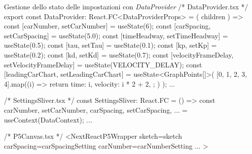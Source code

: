 \begin{tsCode}{Gestione dello stato delle impostazioni con \textit{DataProvider}}
/* DataProvider.tsx */
export const DataProvider: React.FC<DataProviderProps> = ({ children }) => {
  const [carNumber, setCarNumber] = useState(6);
  const [carSpacing, setCarSpacing] = useState(5.0);
  const [timeHeadway, setTimeHeadway] = useState(0.5);
  const [tau, setTau] = useState(0.1);
  const [kp, setKp] = useState(0.2);
  const [kd, setKd] = useState(0.7);
  const [velocityFrameDelay, setVelocityFrameDelay] = useState(VELOCITY_DELAY);
  const [leadingCarChart, setLeadingCarChart] = useState<GraphPoints[]>(
    [0, 1, 2, 3, 4].map((i) => {
      return {
        time: i,
        velocity: i * 2 + 2,
      };
    })
  );
  ...
}

/* SettingsSliver.tsx */
const SettingsSliver: React.FC = () => {
  const { carNumber, setCarNumber, carSpacing, setCarSpacing, ... } = useContext(DataContext);
  ...
}

/* P5Canvas.tsx */
<NextReactP5Wrapper
  sketch={sketch}
  carSpacing={carSpacingSetting}
  carNumber={carNumberSetting}
  ...
>
\end{tsCode}